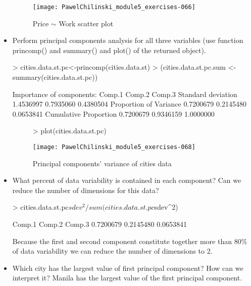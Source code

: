 \documentclass[a4paper]{article}
\begin{document}
\begin{itemize}
\begin{figure}[H]
\begin{center}
\begin{Schunk}
\end{Schunk}
\texttt{[image: PawelChilinski\_module5\_exercises-066]}
\caption{Price $\sim$ Work scatter plot}
\end{center}
\end{figure}
\item Perform principal components analysis for all three variables (use
function princomp() and summary() and plot() of the returned object).
\begin{Schunk}
\begin{Sinput}
> cities.data.st.pc<-princomp(cities.data.st)
> (cities.data.st.pc.sum <- summary(cities.data.st.pc))
\end{Sinput}
\begin{Soutput}
Importance of components:
                          Comp.1    Comp.2    Comp.3
Standard deviation     1.4536997 0.7935060 0.4380504
Proportion of Variance 0.7200679 0.2145480 0.0653841
Cumulative Proportion  0.7200679 0.9346159 1.0000000
\end{Soutput}
\end{Schunk}
\begin{figure}[H]
\begin{center}
\begin{Schunk}
\begin{Sinput}
> plot(cities.data.st.pc)
\end{Sinput}
\end{Schunk}
\texttt{[image: PawelChilinski\_module5\_exercises-068]}
\caption{Principal components' variance of cities data}
\end{center}
\end{figure}
\item What percent of data variability is contained in each component? Can we
reduce the number of dimensions for this data?
\begin{Schunk}
\begin{Sinput}
> cities.data.st.pc$sdev^2/sum(cities.data.st.pc$sdev^2)
\end{Sinput}
\begin{Soutput}
   Comp.1    Comp.2    Comp.3 
0.7200679 0.2145480 0.0653841 
\end{Soutput}
\end{Schunk}
Because the first and second component constitute together more than 80\% of
data variability we can reduce the number of dimensions to 2.
\item Which city has the largest value of first principal component? How can we
interpret it?
Manila has the largest value of the first principal component.

\end{itemize}
\end{document}
